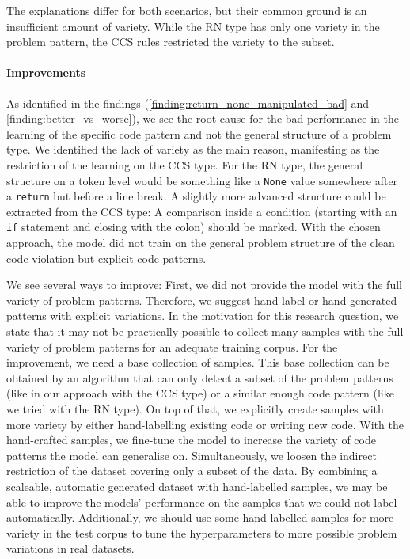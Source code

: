 The explanations differ for both scenarios, but their common ground is an insufficient amount of variety. While the RN type has only one variety in the problem pattern, the CCS rules restricted the variety to the subset.

\paragraph{Improvements}
As identified in the findings (\ref{finding:return_none_manipulated_bad} and \ref{finding:better_vs_worse}), we see the root cause for the bad performance in the learning of the specific code pattern and not the general structure of a problem type. We identified the lack of variety as the main reason, manifesting as the restriction of the learning on the CCS type. For the RN type, the general structure on a token level would be something like a \texttt{None} value somewhere after a \texttt{return} but before a line break. A slightly more advanced structure could be extracted from the CCS type: A comparison inside a condition (starting with an \texttt{if} statement and closing with the colon) should be marked. With the chosen approach, the model did not train on the general problem structure of the clean code violation but explicit code patterns. 

We see several ways to improve:
First, we did not provide the model with the full variety of problem patterns. Therefore, we suggest hand-label or hand-generated patterns with explicit variations.
In the motivation for this research question, we state that it may not be practically possible to collect many samples with the full variety of problem patterns for an adequate training corpus. For the improvement, we need a base collection of samples. This base collection can be obtained by an algorithm that can only detect a subset of the problem patterns (like in our approach with the CCS type) or a similar enough code pattern (like we tried with the RN type). On top of that, we explicitly create samples with more variety by either hand-labelling existing code or writing new code. With the hand-crafted samples, we fine-tune the model to increase the variety of code patterns the model can generalise on. Simultaneously, we loosen the indirect restriction of the dataset covering only a subset of the data. By combining a scaleable, automatic generated dataset with hand-labelled samples, we may be able to improve the models' performance on the samples that we could not label automatically. Additionally, we should use some hand-labelled samples for more variety in the test corpus to tune the hyperparameters to more possible problem variations in real datasets.

